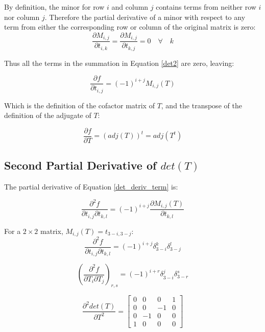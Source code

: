 \documentclass{report}
\begin{document}
By definition, the minor for row $i$ and column $j$ contains terms from neither row $i$ nor column $j$. Therefore the partial derivative of a minor with respect to any term from either the corresponding row or column of the original matrix is zero:
\begin{equation}\label{det3}
\frac{\partial M_{i,j}}{\partial t_{i,k}} = 
\frac{\partial M_{i,j}}{\partial t_{k,j}} = 0 \quad \forall \quad k
\end{equation}

Thus all the terms in the summation in Equation \ref{det2} are zero, leaving:

\begin{equation}\label{det_deriv_term}
\frac{\partial f}{\partial t_{i,j}} = (-1)^{i+j}M_{i,j}(T)
\end{equation}

Which is the definition of the cofactor matrix of $T$, and the transpose of the definition of the adjugate of $T$:

\begin{equation}
\frac{\partial f}{\partial T} = (adj(T))^t = adj(T^t)
\end{equation}

\subsection{Second Partial Derivative of $det(T)$}

The partial derivative of Equation \ref{det_deriv_term} is:

\begin{equation}
\frac{\partial^2 f}{\partial t_{i,j} \partial t_{k,l}} = (-1)^{i+j}\frac{\partial M_{i,j}(T)}{\partial t_{k,l}}
\end{equation}

For a $2 \times 2$ matrix, $M_{i,j}(T) = t_{3-i,3-j}$:
\begin{equation}
\frac{\partial^2 f}{\partial t_{i,j} \partial t_{k,l}} = 
(-1)^{i+j} \delta_{3-i}^k \delta_{3-j}^l
\end{equation}

\begin{equation}
\left(\frac{\partial^2 f}{\partial T_i \partial T_j}\right)_{r,s} =
(-1)^{i+r} \delta_{3-i}^j \delta_{3-r}^s
\end{equation}

\begin{equation}
\frac{\partial^2 det(T)}{\partial T^2} =
\left[ \begin{array}{cccc}
0 & 0 & 0 & 1 \\
0 & 0 & -1 & 0 \\
0 & -1 & 0 & 0 \\
1 & 0 & 0 & 0 
\end{array} \right]
\end{equation}
\end{document}
